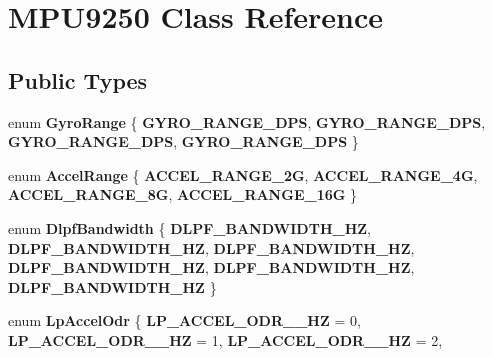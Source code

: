 \hypertarget{class_m_p_u9250}{}\section{M\+P\+U9250 Class Reference}
\label{class_m_p_u9250}
\subsection*{Public Types}
\begin{DoxyCompactItemize}
\item 
\mbox{\label{class_m_p_u9250_afef8319c985d9930cd31797263b37585}} 
enum {\bfseries Gyro\+Range} \{ {\bfseries G\+Y\+R\+O\+\_\+\+R\+A\+N\+G\+E\+\_\+D\+PS}, 
{\bfseries G\+Y\+R\+O\+\_\+\+R\+A\+N\+G\+E\+\_\+D\+PS}, 
{\bfseries G\+Y\+R\+O\+\_\+\+R\+A\+N\+G\+E\+\_\+D\+PS}, 
{\bfseries G\+Y\+R\+O\+\_\+\+R\+A\+N\+G\+E\+\_\+D\+PS}
 \}
\item 
\mbox{\label{class_m_p_u9250_a1d1d4f36ec5a9cd9cea9e196b02cb0f1}} 
enum {\bfseries Accel\+Range} \{ {\bfseries A\+C\+C\+E\+L\+\_\+\+R\+A\+N\+G\+E\+\_\+2G}, 
{\bfseries A\+C\+C\+E\+L\+\_\+\+R\+A\+N\+G\+E\+\_\+4G}, 
{\bfseries A\+C\+C\+E\+L\+\_\+\+R\+A\+N\+G\+E\+\_\+8G}, 
{\bfseries A\+C\+C\+E\+L\+\_\+\+R\+A\+N\+G\+E\+\_\+16G}
 \}
\item 
\mbox{\label{class_m_p_u9250_a7eb38e4553c5cb064169037c6172baa8}} 
enum {\bfseries Dlpf\+Bandwidth} \{ \newline
{\bfseries D\+L\+P\+F\+\_\+\+B\+A\+N\+D\+W\+I\+D\+T\+H\+\_\+HZ}, 
{\bfseries D\+L\+P\+F\+\_\+\+B\+A\+N\+D\+W\+I\+D\+T\+H\+\_\+HZ}, 
{\bfseries D\+L\+P\+F\+\_\+\+B\+A\+N\+D\+W\+I\+D\+T\+H\+\_\+HZ}, 
{\bfseries D\+L\+P\+F\+\_\+\+B\+A\+N\+D\+W\+I\+D\+T\+H\+\_\+HZ}, 
\newline
{\bfseries D\+L\+P\+F\+\_\+\+B\+A\+N\+D\+W\+I\+D\+T\+H\+\_\+HZ}, 
{\bfseries D\+L\+P\+F\+\_\+\+B\+A\+N\+D\+W\+I\+D\+T\+H\+\_\+HZ}
 \}
\item 
\mbox{\label{class_m_p_u9250_a497013a9b2a7273571fb83c9c2b2266f}} 
enum {\bfseries Lp\+Accel\+Odr} \{ \newline
{\bfseries L\+P\+\_\+\+A\+C\+C\+E\+L\+\_\+\+O\+D\+R\+\_\+\_\+HZ} = 0, 
{\bfseries L\+P\+\_\+\+A\+C\+C\+E\+L\+\_\+\+O\+D\+R\+\_\+\_\+HZ} = 1, 
{\bfseries L\+P\+\_\+\+A\+C\+C\+E\+L\+\_\+\+O\+D\+R\+\_\+\_\+HZ} = 2, 

\end{DoxyCompactItemize}
